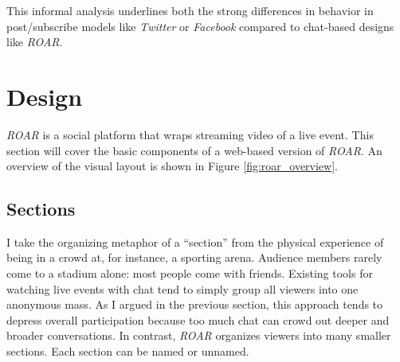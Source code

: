 This informal analysis underlines both the strong differences in behavior in post/subscribe models like \emph{Twitter} or \emph{Facebook} compared to chat-based designs like \emph{ROAR}.










\section{Design}

\emph{ROAR} is a social platform that wraps streaming video of a live event. This section will cover the basic components of a web-based version of \emph{ROAR}. An overview of the visual layout is shown in Figure \ref{fig:roar_overview}. 

\subsection{Sections}

I take the organizing metaphor of a ``section'' from the physical experience of being in a crowd at, for instance, a sporting arena. Audience members rarely come to a stadium alone: most people come with friends. Existing tools for watching live events with chat tend to simply group all viewers into one anonymous mass. As I argued in the previous section, this approach tends to depress overall participation because too much chat can crowd out deeper and broader conversations. In contrast, \emph{ROAR} organizes viewers into many  smaller sections. Each section can be named or unnamed. 

